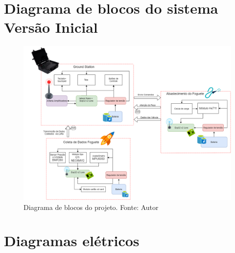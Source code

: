 \begin{apendicesenv}
\chapter{Diagrama de blocos do sistema Versão Inicial}
\label{Diagrama de blocos do sistema}
\begin{figure}[htb]
    \centering
    \includegraphics[width=1\textwidth, angle=90]{figuras/diagrama pi2 (2).png}
    \caption{Diagrama de blocos do projeto. Fonte: Autor}
    \label{fig:Diagrama de Blocos}
\end{figure}


\chapter{Diagramas elétricos}
\label{diag_eletrico}


\end{apendicesenv}
